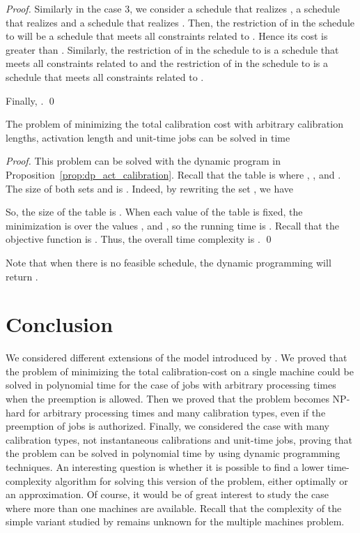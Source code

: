\begin{proof}
Similarly in the case 3, we consider a schedule  that realizes , a schedule  that realizes  and a schedule  that realizes . Then, the restriction of  in the schedule  to  will be a schedule that meets all constraints related to . Hence its cost is greater than . Similarly, the restriction of  in the schedule  to  is a schedule that meets all constraints related to  and the restriction of  in the schedule  to  is a schedule that meets all constraints related to .

Finally, .
\qed\end{proof}





\begin{prop}
The problem of minimizing the total calibration cost with arbitrary calibration
lengths, activation length and unit-time jobs can be solved in time
\end{prop}

\begin{proof}
This problem can be solved with the dynamic program in Proposition~\ref{prop:dp_act_calibration}. Recall that the table is  where , ,  and .
The size of both sets  and  is . Indeed, by rewriting the set , we have

So, the size of the table is . When each value of the table is fixed, the minimization is over the values ,  and , so the running time is . 
Recall that the objective function is 
 .
Thus, the overall time complexity is .
\qed\end{proof}


Note that when there is no feasible schedule, the dynamic programming will return .







\section{Conclusion}
We considered different extensions of the model introduced by 
\cite{bender2013efficient}. We proved that the problem of minimizing the total calibration-cost on a single machine could be solved in polynomial time for the case of jobs with arbitrary processing times when the preemption is allowed. Then we proved that the problem becomes NP-hard for arbitrary processing times and many calibration types, even if the preemption of jobs is authorized. Finally, we considered the case with many calibration types, not instantaneous calibrations and unit-time jobs, proving that the problem can be solved in polynomial time by using dynamic programming techniques. An interesting question is whether it is possible to find a lower time-complexity algorithm for solving this version of the problem, either optimally or an approximation. Of course, it would be of great interest to study the case where more than one machines are available. Recall that the complexity of the simple variant studied by \cite{bender2013efficient} remains unknown for the multiple machines problem.


      



